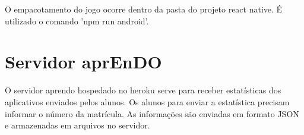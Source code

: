 O empacotamento do jogo ocorre dentro da pasta do projeto react native. É utilizado o comando 'npm run android'.

\section[Servidor aprEnDO]{Servidor aprEnDO}
O servidor aprendo hospedado no heroku serve para receber estatísticas dos aplicativos enviados pelos alunos. Os alunos para enviar a estatística precisam informar o número da matrícula. As informações são enviadas em formato JSON e armazenadas em arquivos no servidor. 


